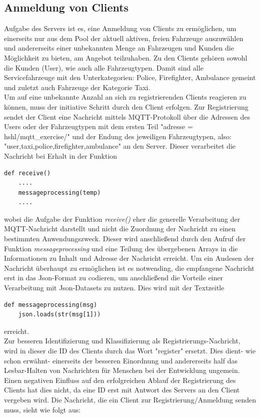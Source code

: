 \documentclass[conference]{IEEEtran}
\begin{document}
\subsection{Anmeldung von Clients}
Aufgabe des Servers ist es, eine Anmeldung von Clients zu ermöglichen, um einerseits nur aus dem Pool der aktuell aktiven, freien Fahrzeuge auszuwählen und andererseits einer unbekannten Menge an Fahrzeugen und Kunden die Möglichkeit zu bieten, am Angebot teilzuhaben. Zu den Clients gehören sowohl die Kunden (User), wie auch alle Fahrzeugtypen. Damit sind alle Servicefahrzeuge mit den Unterkategorien: Police, Firefighter, Ambulance gemeint und zuletzt auch Fahrzeuge der Kategorie Taxi.\\ 
Um auf eine unbekannte Anzahl an sich zu registrierenden Clients reagieren zu können, muss der initiative Schritt durch den Client erfolgen. Zur Registrierung sendet der Client eine Nachricht mittels MQTT-Protokoll über die Adressen des Users oder der Fahrzeugtypen mit dem ersten Teil \textsf{"adresse = hshl/mqtt\_exercise/"} und der Endung des jeweiligen Fahrzeugtypen, also: \textsf{"user,taxi,police,firefighter,ambulance"} an den Server. Dieser verarbeitet die Nachricht bei Erhalt in der Funktion  
\begin{lstlisting}
def receive()
	....
	messageprocessing(temp)
	....
\end{lstlisting}
 wobei die Aufgabe der Funktion  \textit{receive()} eher die generelle Verarbeitung der MQTT-Nachricht darstellt und nicht die Zuordnung der Nachricht zu einen bestimmten Anwendungszweck. 
Dieser wird anschließend durch den Aufruf der Funktion \textit{messageprocessing} und eine Teilung des übergebenen Arrays in die Informationen zu Inhalt und Adresse der Nachricht erreicht.
Um ein Auslesen der Nachricht überhaupt zu ermöglichen ist es notwending, die empfangene Nachricht erst in das Json-Format zu codieren, um anschließend die Vorteile einer Verarbeitung mit Json-Datasets zu nutzen. Dies wird mit der Textzeitle \begin{lstlisting}
def messageprocessing(msg)
	json.loads(str(msg[1]))
\end{lstlisting}
 erreicht.\\
 Zur besseren Identifizierung und Klassifizierung als Registrierungs-Nachricht, wird in dieser die ID des Clients durch das Wort "register" ersetzt. Dies dient- wie schon erwähnt- einerseits der besseren Einordnung und andererseits half das Lesbar-Halten von Nachrichten für Menschen bei der Entwicklung ungemein. Einen negativen Einfluss auf den erfolgreichen Ablauf der Registrierung des Clients hat dies nicht, da eine ID erst mit Antwort des Servers an den Client vergeben wird. Die Nachricht, die ein Client zur Registrierung/Anmeldung senden muss, sieht wie folgt aus:
\end{document}
